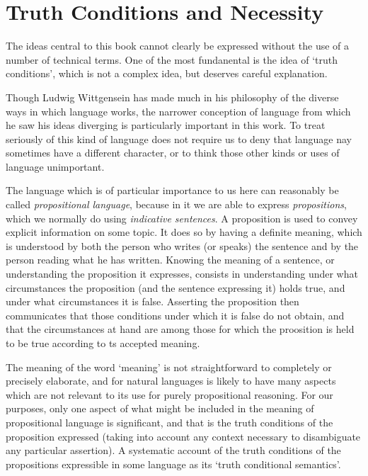\section{Truth Conditions and Necessity}\label{TruthConditionsAndNecessity}

The ideas central to this book cannot clearly be expressed without the use of a number of technical terms.
One of the most fundanental is the idea of `truth conditions', which is not a complex idea, but deserves careful explanation.

Though Ludwig Wittgensein has made much in his philosophy of the diverse ways in which language works, the narrower conception of language from which he saw his ideas diverging is particularly important in this work.
To treat seriously of this kind of language does not require us to deny that language nay sometimes have a different character, or to think those other kinds or uses of language unimportant.

The language which is of particular importance to us here can reasonably be called \emph{propositional language}, because in it we are able to express \emph{propositions}, which we normally do using \emph{indicative sentences}.
A proposition is used to convey explicit information on some topic.
It does so by having a definite meaning, which is understood by both the person who writes (or speaks) the sentence and by the person reading what he has written.
Knowing the meaning of a sentence, or understanding the proposition it expresses, consists in understanding under what circumstances the proposition (and the sentence expressing it) holds true, and under what circumstances it is false.
Asserting the proposition then communicates that those conditions under which it is false do not obtain, and that the circumstances at hand are among those for which the proosition is held to be true according to ts accepted meaning.

The meaning of the word `meaning' is not straightforward to completely or precisely elaborate, and for natural languages is likely to have many aspects which are not relevant to its use for purely propositional reasoning.
For our purposes, only one aspect of what might be included in the meaning of propositional language is significant, and that is the truth conditions of the proposition expressed (taking into account any context necessary to disambiguate any particular assertion).
A systematic account of the truth conditions of the propositions expressible in some language as its `truth conditional semantics'.


